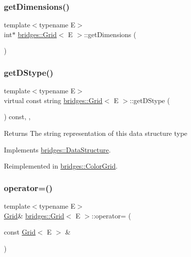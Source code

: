 \subsubsection{\texorpdfstring{get\+Dimensions()}{getDimensions()}}
{\footnotesize\ttfamily template$<$typename E$>$ \\
int$\ast$ \mbox{\hyperlink{classbridges_1_1_grid}{bridges\+::\+Grid}}$<$ E $>$\+::get\+Dimensions (\begin{DoxyParamCaption}{ }\end{DoxyParamCaption})\hspace{0.3cm}{\ttfamily [inline]}}

\mbox{\label{classbridges_1_1_grid_ab701d081de4f7ffafb15966758dd5446}} 
\subsubsection{\texorpdfstring{get\+D\+Stype()}{getDStype()}}
{\footnotesize\ttfamily template$<$typename E$>$ \\
virtual const string \mbox{\hyperlink{classbridges_1_1_grid}{bridges\+::\+Grid}}$<$ E $>$\+::get\+D\+Stype (\begin{DoxyParamCaption}{ }\end{DoxyParamCaption}) const\hspace{0.3cm}{\ttfamily [inline]}, {\ttfamily [override]}, {\ttfamily [virtual]}}

\begin{DoxyReturn}{Returns}
The string representation of this data structure type 
\end{DoxyReturn}


Implements \mbox{\hyperlink{classbridges_1_1_data_structure_a957a63b106e340bc753620c650632bdc}{bridges\+::\+Data\+Structure}}.



Reimplemented in \mbox{\hyperlink{classbridges_1_1_color_grid_a6bb93994dade8e79a197459532dad153}{bridges\+::\+Color\+Grid}}.

\mbox{\label{classbridges_1_1_grid_ab79fc10a9ebd55dd3565ca1ea6933b13}} 
\subsubsection{\texorpdfstring{operator=()}{operator=()}}
{\footnotesize\ttfamily template$<$typename E$>$ \\
\mbox{\hyperlink{classbridges_1_1_grid}{Grid}}\& \mbox{\hyperlink{classbridges_1_1_grid}{bridges\+::\+Grid}}$<$ E $>$\+::operator= (\begin{DoxyParamCaption}\item[{const \mbox{\hyperlink{classbridges_1_1_grid}{Grid}}$<$ E $>$ \&}]{ }\end{DoxyParamCaption})\hspace{0.3cm}{\ttfamily [delete]}}

